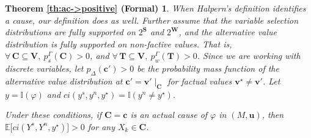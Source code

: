 \documentclass[anon,12pt]{clear2026} %
\newtheorem*{theoremacpositive}{Theorem \ref{th:ac->positive} (Formal)}
\begin{document}
\begin{theoremacpositive}
When Halpern's definition identifies a cause, our definition does as well. 
Further assume that the variable selection distributions are fully supported on $2^\mathbf{S}$ and $2^\mathbf{W}$, and the alternative value distribution is fully supported on non-factive values. That is, $\forall \,\mathbf{C} \subseteq \mathbf{V},\ p^\Gamma_s(\mathbf{C}) > 0$, and $\forall \,\mathbf{T} \subseteq \mathbf{V},\ p^\Gamma_w(\mathbf{T}) > 0$. Since we are working with discrete variables, let $p_\Delta(\mathbf{c}') > 0$ be the probability mass function of the alternative value distribution at $\mathbf{c}' = \mathbf{v}'\!\mid_{\mathbf{C}}$ for factual values $\mathbf{v}^\star \ne \mathbf{v}'$.
Let $y = \mathbb{I}(\varphi)$ and $ci(y^s, y^n, y^\star) = \mathbb{I}(y^n \neq y^\star)$.

Under these conditions, if $\mathbf{C} = \mathbf{c}$ is an actual cause of $\varphi$ in $(M, \mathbf{u})$, then $\mathbb{E} \big[ ci(Y^s, Y^n, y^\star) \big] > 0$ for any $X_k\in \mathbf{C}$.
\end{theoremacpositive}
\end{document}
